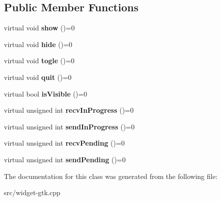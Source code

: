 \subsection*{\-Public \-Member \-Functions}
\begin{DoxyCompactItemize}
\item 
\hypertarget{classdialogControl_ae0cfab12343a4ca5020725cba607a647}{virtual void {\bfseries show} ()=0}\label{classdialogControl_ae0cfab12343a4ca5020725cba607a647}

\item 
\hypertarget{classdialogControl_a25711f43f6ebda70d81a4cb234f43bc1}{virtual void {\bfseries hide} ()=0}\label{classdialogControl_a25711f43f6ebda70d81a4cb234f43bc1}

\item 
\hypertarget{classdialogControl_a4b21000178c2ed03b9d8ac3661731ae5}{virtual void {\bfseries togle} ()=0}\label{classdialogControl_a4b21000178c2ed03b9d8ac3661731ae5}

\item 
\hypertarget{classdialogControl_af3389063b78e024c4bc0f13c23109422}{virtual void {\bfseries quit} ()=0}\label{classdialogControl_af3389063b78e024c4bc0f13c23109422}

\item 
\hypertarget{classdialogControl_a2c338a4d3a1272dea56b4914b941c416}{virtual bool {\bfseries is\-Visible} ()=0}\label{classdialogControl_a2c338a4d3a1272dea56b4914b941c416}

\item 
\hypertarget{classdialogControl_a8f790660b3bae8b3e0d6cd922647187c}{virtual unsigned int {\bfseries recv\-In\-Progress} ()=0}\label{classdialogControl_a8f790660b3bae8b3e0d6cd922647187c}

\item 
\hypertarget{classdialogControl_a3935e87c298eabbe31a3962f54306a50}{virtual unsigned int {\bfseries send\-In\-Progress} ()=0}\label{classdialogControl_a3935e87c298eabbe31a3962f54306a50}

\item 
\hypertarget{classdialogControl_aa89e9823d926e4fa7d0cf19b043dca2d}{virtual unsigned int {\bfseries recv\-Pending} ()=0}\label{classdialogControl_aa89e9823d926e4fa7d0cf19b043dca2d}

\item 
\hypertarget{classdialogControl_a8f09ab14093fa7a739e7833a87856176}{virtual unsigned int {\bfseries send\-Pending} ()=0}\label{classdialogControl_a8f09ab14093fa7a739e7833a87856176}

\end{DoxyCompactItemize}


\-The documentation for this class was generated from the following file\-:\begin{DoxyCompactItemize}
\item 
src/widget-\/gtk.\-cpp\end{DoxyCompactItemize}
